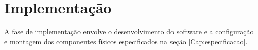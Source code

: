 \chapter{Implementação}
\label{Cap:implementacao}

A fase de implementação envolve o desenvolvimento do software e a configuração e montagem dos componentes físicos  especificados na seção \ref{Cap:especificacao}.


